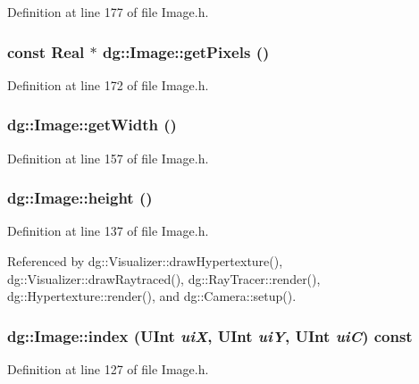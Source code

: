 Definition at line 177 of file Image.h.
\subsubsection{\setlength{\rightskip}{0pt plus 5cm}const {\bf Real} $\ast$ dg::Image::get\-Pixels ()\hspace{0.3cm}{\tt  [inline]}}\label{classdg_1_1Image_a16}




Definition at line 172 of file Image.h.
\subsubsection{ dg::Image::get\-Width ()\hspace{0.3cm}{\tt  [inline]}}\label{classdg_1_1Image_a11}




Definition at line 157 of file Image.h.
\subsubsection{ dg::Image::height ()\hspace{0.3cm}{\tt  [inline]}}\label{classdg_1_1Image_a9}




Definition at line 137 of file Image.h.

Referenced by dg::Visualizer::draw\-Hypertexture(), dg::Visualizer::draw\-Raytraced(), dg::Ray\-Tracer::render(), dg::Hypertexture::render(), and dg::Camera::setup().
\subsubsection{ dg::Image::index ({\bf UInt} {\em ui\-X}, {\bf UInt} {\em ui\-Y}, {\bf UInt} {\em ui\-C}) const\hspace{0.3cm}{\tt  [inline]}}\label{classdg_1_1Image_a7}




Definition at line 127 of file Image.h.
